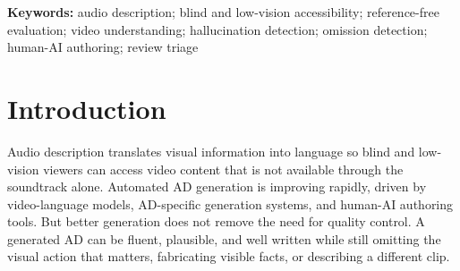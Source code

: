 \documentclass[10pt,twocolumn]{article}
\begin{document}
\begin{abstract}
For safety, a CLIP grounding-drop gate reaches AUC = 0.835 with 70\% recall at 10\% false-positive rate for controlled visual hallucinations, while a raw-CLIP wrong-content gate catches 98.3\% of catastrophic wrong-clip descriptions at 2.2\% false alarm. Beyond ranking, we add a reference-free \textbf{error-detection} layer: a fused CLIP+ADQA fabrication detector reaches AUC = 0.904 (72\% recall at 10\% false-positive rate), and a lexical omission detector separates professional from corrupted descriptions at clip-level AUC = 0.945 on a 23-clip probe pilot --- revealing that even professional ADs state the probed key visual fact only 61.8\% of the time, an omission blind spot that reference-keyed scoring cannot see. For triage, TRIBE is deliberately excluded from the AD-level score: a clip-level neural gap cannot alter within-clip candidate ranking. Its useful role is review prioritization. In cached external validation, TRIBE/gap-route features predict corrected ADQA failures at AUC = 0.794 with category-shuffle p = 0.003, outperforming category, transcript/speech, duration, and word-count confounds; the same neural gap also resists cheap \emph{visual}-motion proxies (AUC = 0.796 vs $\le$0.63 for frame-difference statistics on 57 downloaded clips), so it is not a motion detector in disguise. SceneTwin is an audit layer for hybrid AI+human AD workflows, not a replacement for professional describers or blind-user validation.
\end{abstract}

\noindent\textbf{Keywords:} audio description; blind and low-vision accessibility; reference-free evaluation; video understanding; hallucination detection; omission detection; human-AI authoring; review triage

\section{Introduction}


Audio description translates visual information into language so blind and low-vision viewers can access video content that is not available through the soundtrack alone. Automated AD generation is improving rapidly, driven by video-language models, AD-specific generation systems, and human-AI authoring tools. But better generation does not remove the need for quality control. A generated AD can be fluent, plausible, and well written while still omitting the visual action that matters, fabricating visible facts, or describing a different clip.
\end{document}
